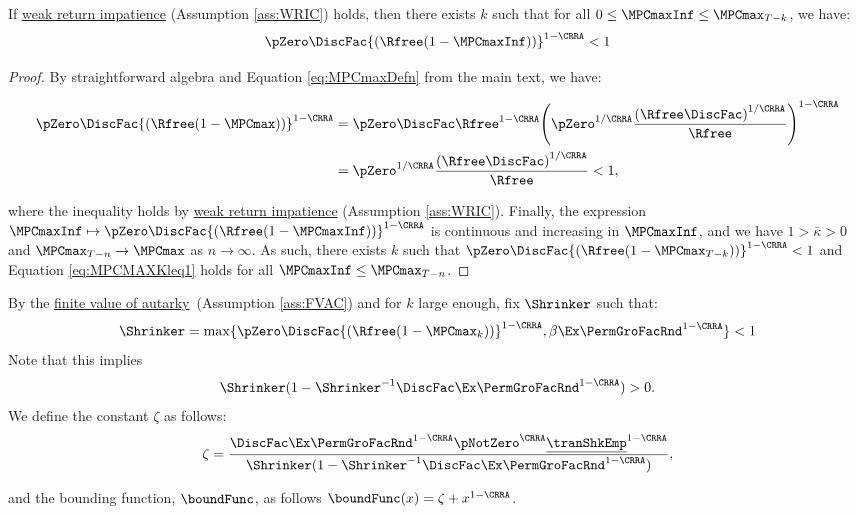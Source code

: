 \documentclass[\econtexRoot/BufferStockTheory]{subfiles}
\begin{document}
\begin{claim}\label{claim:MPCMAXKleq1}
If \hyperlink{WRIC}{weak return impatience} (Assumption \ref{ass:WRIC}) holds, then there exists $k$ such that for all $0\leq\MPCmaxInf\leq \MPCmax_{T-k}$, we have:
%
\begin{equation}\label{eq:MPCMAXKleq1}
  \pZero \DiscFac {(\Rfree (1-\MPCmaxInf))}^{1-\CRRA}   < 1
\end{equation}
%
\end{claim}
\begin{proof}

By straightforward algebra and Equation \eqref{eq:MPCmaxDefn} from the main text, we have:

\begin{equation}\begin{gathered}\begin{aligned}
\pZero \DiscFac {(\Rfree (1-\MPCmax))}^{1-\CRRA}  & = \pZero\DiscFac\Rfree^{1-\CRRA}{\left(\pZero^{1/\CRRA}\frac{{(\Rfree\DiscFac)}^{1/\CRRA}}{\Rfree}\right)}^{1-\CRRA} \\\notag
& = \pZero^{1/\CRRA}\frac{{(\Rfree\DiscFac)}^{1/\CRRA}}{\Rfree} <1 \notag,
\end{aligned}\end{gathered}\end{equation}

where the inequality holds by \hyperlink{WRIC}{weak return impatience} (Assumption \ref{ass:WRIC}).
Finally, the expression $\MPCmaxInf\mapsto \pZero \DiscFac {(\Rfree (1-\MPCmaxInf))}^{1-\CRRA} $ is continuous and increasing in $\MPCmaxInf$, and we have $1>\bar{\kappa}>0$ and $\MPCmax_{T-n} \rightarrow \MPCmax$ as $n\rightarrow\infty$.
As such, there exists $k$ such that $\pZero \DiscFac {(\Rfree (1-\MPCmax_{T-k}))}^{1-\CRRA}<1$ and Equation \eqref{eq:MPCMAXKleq1} holds for all $\MPCmaxInf\leq \MPCmax_{T-n}$.


\end{proof}


\begin{remark}\label{rem:shnkrdef}
By the \hyperlink{FVAC}{finite value of autarky}~(Assumption \ref{ass:FVAC}) and for $k$ large enough, fix $\Shrinker$ such that:
%
\begin{equation}\label{eq:shnkrdef}
\Shrinker = \max\{\pZero \DiscFac {(\Rfree (1-\MPCmax_{k}))}^{1-\CRRA},\beta\Ex\PermGroFacRnd^{1-\CRRA}\}<1
\end{equation}
%
Note that this implies
%
\begin{equation}\label{eq:shrnkrCond}
\Shrinker(1- \Shrinker^{-1}\DiscFac \Ex\PermGroFacRnd^{1-\CRRA })>0. 
\end{equation}
%
We define the constant $\zeta$ as follows:
%
\begin{equation}\label{eq:Mbarddef}
\zeta = \frac{\DiscFac \Ex \PermGroFacRnd^{1-\CRRA }\pNotZero^{\CRRA}\underline{\tranShkEmp}^{1-\CRRA}}{\Shrinker(1- \Shrinker^{-1}\DiscFac \Ex \PermGroFacRnd^{1-\CRRA })}, 
\end{equation}

and the bounding function, $\boundFunc$, as follows $\boundFunc(x) = \zeta +  x^{1-\CRRA}$.


\end{remark}
\end{document}
